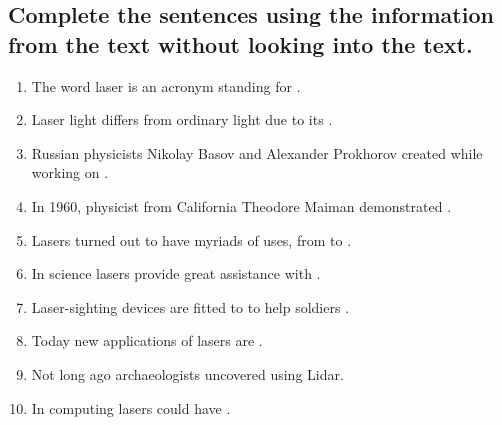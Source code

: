 \subsection*{Complete the sentences using the information from the text without
      looking into the text.}
\begin{enumerate}
      \item The word laser is an acronym standing for \underline{\hspace{2cm}}.
      \item Laser light differs from ordinary light due to its \underline{\hspace{2cm}}.
      \item Russian physicists Nikolay Basov and Alexander Prokhorov created
            \underline{\hspace{2cm}} while working on \underline{\hspace{2cm}}.
      \item In 1960, physicist from California Theodore Maiman demonstrated
            \underline{\hspace{2cm}}.
      \item Lasers turned out to have myriads of uses, from \underline{\hspace{2cm}}
            to \underline{\hspace{2cm}}.
      \item In science lasers provide great assistance with \underline{\hspace{2cm}}.
      \item Laser-sighting devices are fitted to \underline{\hspace{2cm}} to help
            soldiers \underline{\hspace{2cm}}.
      \item Today new applications of lasers are \underline{\hspace{2cm}}.
      \item Not long ago archaeologists uncovered \underline{\hspace{2cm}} using Lidar.
      \item In computing lasers could have \underline{\hspace{2cm}}.
\end{enumerate}

